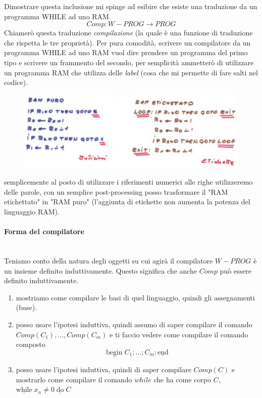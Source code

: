 \documentclass{article}
\begin{document}
Dimostrare questa inclusione mi spinge ad esibire che esiste una traduzione da un programma WHILE ad
uno RAM
$$Comp:W-PROG\rightarrow PROG$$
Chiamerò questa traduzione \textit{compilazione} (la quale è una funzione di traduzione che
rispetta le tre proprietà). Per pura comodità, scrivere un compilatore da un programma WHILE ad uno
RAM vuol dire prendere un programma del primo tipo e scrivere un frammento del secondo, per semplicità
ammetterò di utilizzare un programma RAM che utilizza delle \textit{label} (cosa che mi permette
di fare salti nel codice).

\begin{figure}[H]
    \centering
    \includegraphics[scale=0.4]{images/ram_etichettato.png}
\end{figure}

semplicemente al posto di utilizzare i riferimenti numerici alle righe utilizzeremo delle parole,
con un semplice post-processing posso trasformare il "RAM etichettato" in "RAM puro" (l'aggiunta
di etichette non aumenta la potenza del linguaggio RAM).

\paragraph{Forma del compilatore}\mbox{}\\
Teniamo conto della natura degli oggetti su cui agirà il compilatore $W-PROG$ è un insieme definito
induttivamente. Questo significa che anche $Comp$ può essere definito induttivamente.

\begin{enumerate}
    \item mostriamo come compilare le basi di quel linguaggio, quindi gli assegnamenti (base).
    \item posso usare l'ipotesi induttiva, quindi assumo di saper compilare il comando $Comp(C_1),\dots,Comp(C_m)$ e ti
          faccio vedere come compilare il comando composto
          $$\underline{\text{begin}}\;C_1;\dots ;C_m; \underline{\text{end}}$$
    \item posso usare l'ipotesi induttiva, quindi di saper compilare $Comp(C)$ e mostrarlo come compilare il comando
          $while$ che ha come corpo $C$, $\underline{\text{while}}\;x_n\neq 0\;\underline{\text{do}}\;C$
\end{enumerate}
\end{document}

